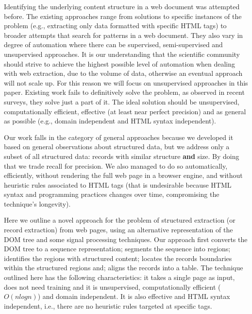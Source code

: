 Identifying the underlying content structure in a web document was attempted
before. The existing approaches range from solutions to specific instances of
the problem (e.g., extracting only data formatted with specific HTML
tags\cite{webtables2008,listExtract2009,qiu2015dexter}) to broader attempts that
search for patterns in a web
document\cite{MDR03,NET05,depta05,TPC09,grigalis2013towards}.
They also vary in degree of automation where there can be supervised,
semi-supervised and unsupervised approaches. It is our understanding that the
scientific community should strive to achieve the highest possible level of
automation when dealing with web extraction, due to the volume of data,
otherwise an eventual approach will not scale up. For this reason we will focus
on unsupervised approaches in this paper.
Existing work fails to definitively solve the problem, as observed in recent
surveys\cite{survey2013,survey2014}, they solve just a part of it. The ideal
solution should be unsupervised, computationally efficient, effective (at
least near perfect precision) and as general as possible (e.g., domain
independent and HTML syntax independent).

Our work falls in the category of general approaches because we developed it
based on general observations about structured data, but we address only a
subset of all structured data: records with similar structure \textbf{and} size.
By doing that we trade recall for precision. We also managed to do so
automatically, efficiently, without rendering the full web page in a browser
engine, and without heuristic rules associated to HTML tags (that is undesirable
because HTML syntax and programming practices changes over time, compromising
the technique's longevity).

Here we outline a novel approach for the problem of structured extraction (or
record extraction) from web pages, using an alternative representation of the
DOM tree and some signal processing techniques. Our approach first converts the
DOM tree to a sequence representation; segments the sequence into regions;
identifies the regions with structured content; locates the records boundaries
within the structured regions and; aligns the records into a table. The
technique outlined here has the following characteristics: it takes a single
page as input, does not need training and it is unsupervised, computationally
efficient ($O(nlogn)$) and domain independent. It is also effective 
and HTML syntax independent, i.e., there are no heuristic rules targeted at
specific tags.

